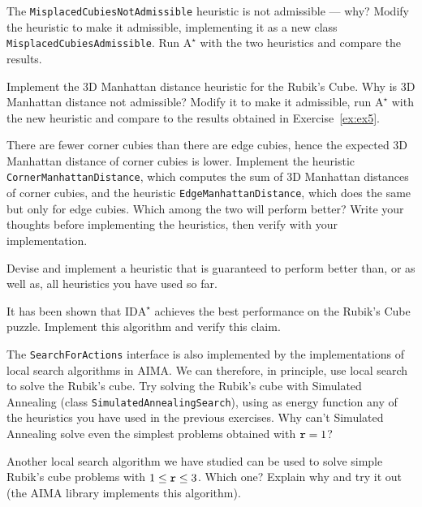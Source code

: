 \documentclass[a4paper]{article}
\begin{document}
{\ex{}\label{ex:ex5} The {\tt MisplacedCubiesNotAdmissible} heuristic is not admissible --- why? Modify the heuristic to make it admissible, implementing it as a new class {\tt MisplacedCubiesAdmissible}. Run $\text{A}^\star$ with the two heuristics and compare the results.\vspace{0.1cm}}


{\ex{}\label{ex:ex7} Implement the 3D Manhattan distance heuristic for the Rubik's Cube.  Why is 3D Manhattan distance not admissible?  Modify it to make it admissible, run $\text{A}^\star$ with the new heuristic and compare to the results obtained in Exercise~\ref{ex:ex5}.\vspace{0.1cm}}

{\ex{}\label{ex:ex8} There are fewer corner cubies than there are edge cubies, hence the expected 3D Manhattan distance of corner cubies is lower. Implement the heuristic {\tt CornerManhattanDistance}, which computes the sum of 3D Manhattan distances of corner cubies, and the heuristic {\tt EdgeManhattanDistance}, which does the same but only for edge cubies. Which among the two will perform better?  Write your thoughts before implementing the heuristics, then verify with your implementation.\vspace{0.1cm}}

{\ex{}\label{ex:ex9} Devise and implement a heuristic that is guaranteed to perform better than, or as well as, all heuristics you have used so far.\vspace{0.1cm}}

{\ex{}\label{ex:ex10} It has been shown that $\text{IDA}^\star$ achieves the best performance on the Rubik's Cube puzzle.  Implement this algorithm and verify this claim.\vspace{0.1cm}}

{\ex{}\label{ex:ex11} The {\tt SearchForActions} interface is also implemented by the implementations of local search algorithms in AIMA. We can therefore, in principle, use local search to solve the Rubik's cube. Try solving the Rubik's cube with Simulated Annealing (class {\tt SimulatedAnnealingSearch}), using as energy function any of the heuristics you have used in the previous exercises. Why can't Simulated Annealing solve even the simplest problems obtained with $\text{{\tt r}} = 1$?\vspace{0.1cm}}

{\ex{}\label{ex:ex12} Another local search algorithm we have studied can be used to solve simple Rubik's cube problems with $1 \leq \text{{\tt r}} \leq 3$. Which one? Explain why and try it out (the AIMA library implements this algorithm).\vspace{0.1cm}}

%
%
\end{document}
